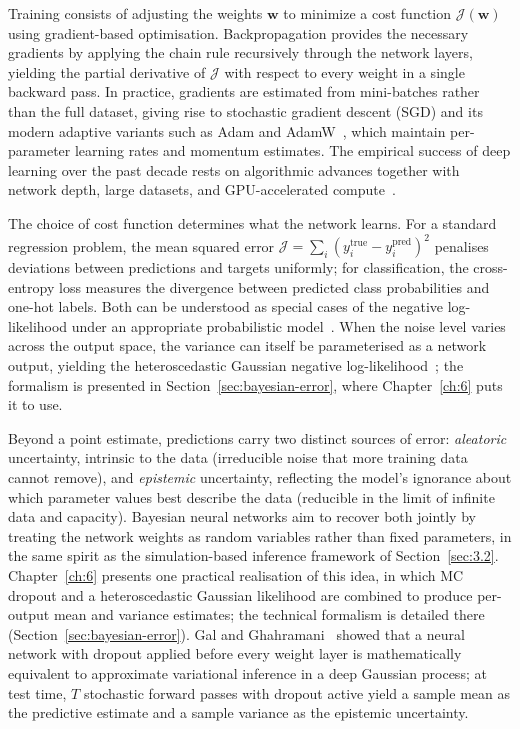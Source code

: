 Training consists of adjusting the weights $\boldsymbol{w}$ to minimize a cost function $\mathcal{J}(\boldsymbol{w})$ using gradient-based optimisation.
Backpropagation provides the necessary gradients by applying the chain rule recursively through the network layers, yielding the partial derivative of $\mathcal{J}$ with respect to every weight in a single backward pass.
In practice, gradients are estimated from mini-batches rather than the full dataset, giving rise to stochastic gradient descent (SGD) and its modern adaptive variants such as Adam and AdamW~\cite{Loshchilov:2017bsp}, which maintain per-parameter learning rates and momentum estimates.
The empirical success of deep learning over the past decade rests on algorithmic advances together with network depth, large datasets, and GPU-accelerated compute~\cite{LeCun:2015pmr}.

The choice of cost function determines what the network learns.
For a standard regression problem, the mean squared error $\mathcal{J} = \sum_i (y_i^\mathrm{true} - y_i^\mathrm{pred})^2$ penalises deviations between predictions and targets uniformly; for classification, the cross-entropy loss measures the divergence between predicted class probabilities and one-hot labels.
Both can be understood as special cases of the negative log-likelihood under an appropriate probabilistic model~\cite{bishop,Murphy:2022pml}.
When the noise level varies across the output space, the variance can itself be parameterised as a network output, yielding the heteroscedastic Gaussian negative log-likelihood~\cite{heteroscedastic-error}; the formalism is presented in Section~\ref{sec:bayesian-error}, where Chapter~\ref{ch:6} puts it to use.

Beyond a point estimate, predictions carry two distinct sources of error: \textit{aleatoric} uncertainty, intrinsic to the data (irreducible noise that more training data cannot remove), and \textit{epistemic} uncertainty, reflecting the model's ignorance about which parameter values best describe the data (reducible in the limit of infinite data and capacity).
Bayesian neural networks aim to recover both jointly by treating the network weights as random variables rather than fixed parameters, in the same spirit as the simulation-based inference framework of Section~\ref{sec:3.2}.
Chapter~\ref{ch:6} presents one practical realisation of this idea, in which MC dropout and a heteroscedastic Gaussian likelihood are combined to produce per-output mean and variance estimates; the technical formalism is detailed there (Section~\ref{sec:bayesian-error}).
Gal and Ghahramani~\cite{mcdropout} showed that a neural network with dropout applied before every weight layer is mathematically equivalent to approximate variational inference in a deep Gaussian process; at test time, $T$ stochastic forward passes with dropout active yield a sample mean as the predictive estimate and a sample variance as the epistemic uncertainty.

